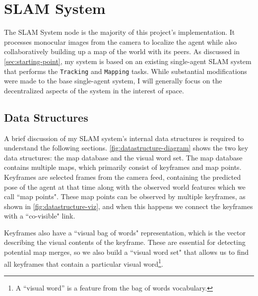 \section{SLAM System}
\label{sec:slam-system}
The SLAM System node is the majority of this project's implementation. It processes monocular images from the camera to localize the agent while also collaboratively building up a map of the world with its peers. As discussed in \autoref{sec:starting-point}, my system is based on an existing single-agent SLAM system that performs the \texttt{Tracking} and \texttt{Mapping} tasks. While substantial modifications were made to the base single-agent system, I will generally focus on the decentralized aspects of the system in the interest of space.

\subsection{Data Structures}
\label{sec:datastructures}
A brief discussion of my SLAM system's internal data structures is required to understand the following sections. \autoref{fig:datastructure-diagram} shows the two key data structures: the map database and the visual word set. The map database contains multiple maps, which primarily consist of keyframes and map points. Keyframes are selected frames from the camera feed, containing the predicted pose of the agent at that time along with the observed world features which we call ``map points". These map points can be observed by multiple keyframes, as shown in \autoref{fig:datastructure-viz}, and when this happens we connect the keyframes with a ``co-visible" link.

Keyframes also have a ``visual bag of words" representation, which is the vector describing the visual contents of the keyframe. These are essential for detecting potential map merges, so we also build a ``visual word set" that allows us to find all keyframes that contain a particular visual word\footnote[1]{A ``visual word'' is a feature from the bag of words vocabulary.}.


